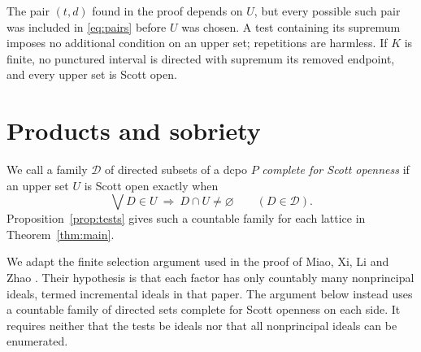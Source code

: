\documentclass[preprint,11pt]{elsarticle}
\theoremstyle{definition}
\theoremstyle{remark}
\numberwithin{equation}{section}
\begin{document}
The pair $(t,d)$ found in the proof depends on $U$, but every possible such pair was included in \eqref{eq:pairs} before $U$ was chosen. A test containing its supremum imposes no additional condition on an upper set; repetitions are harmless. If $K$ is finite, no punctured interval is directed with supremum its removed endpoint, and every upper set is Scott open.

\section{Products and sobriety}
We call a family $\mathcal D$ of directed subsets of a dcpo $P$ \emph{complete for Scott openness} if an upper set $U$ is Scott open exactly when
\[
 \bigvee D\in U\ \Longrightarrow\ D\cap U\ne\varnothing
 \qquad(D\in\mathcal D).
\]
Proposition~\ref{prop:tests} gives such a countable family for each lattice in Theorem~\ref{thm:main}.

We adapt the finite selection argument used in the proof of Miao, Xi, Li and Zhao \cite[Lemma~4.1]{Miao}. Their hypothesis is that each factor has only countably many nonprincipal ideals, termed incremental ideals in that paper. The argument below instead uses a countable family of directed sets complete for Scott openness on each side. It requires neither that the tests be ideals nor that all nonprincipal ideals can be enumerated.
\end{document}
